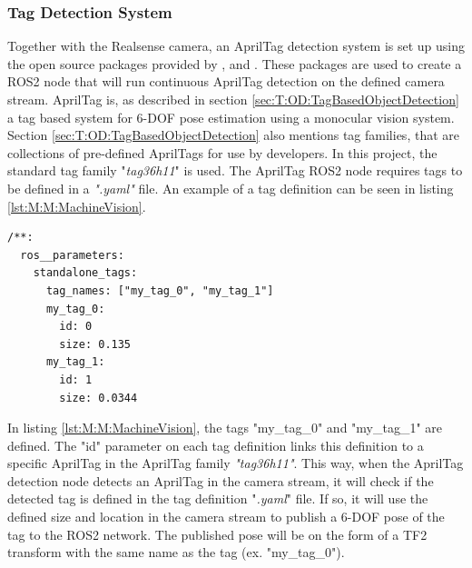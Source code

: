 \subsubsection{Tag Detection System} \label{sec:M:MRC:MV:TagDetectionSystem}
Together with the Realsense camera, an AprilTag detection system is set up using the open source packages provided by \cite{apriltag_repo}, \cite{apriltag_ros_repo} and \cite{apriltag_msgs_repo}. These packages are used to create a ROS2 node that will run continuous AprilTag detection on the defined camera stream. AprilTag is, as described in section \ref{sec:T:OD:TagBasedObjectDetection} a tag based system for 6-DOF pose estimation using a monocular vision system. Section \ref{sec:T:OD:TagBasedObjectDetection} also mentions tag families, that are collections of pre-defined AprilTags for use by developers. In this project, the standard tag family "\textit{tag36h11}" is used. The AprilTag ROS2 node requires tags to be defined in a \textit{".yaml"} file. An example of a tag definition can be seen in listing \ref{lst:M:M:MachineVision}.

\begin{lstlisting}[language=XML, label=lst:M:M:MachineVision, caption={Example of AprilTag tag definitions in a ".yaml" file. This example defines two tags of different names, using the tag id 0 and 1 in the defined tag family The size is alse defined for each tag. The tag family (tag36h11) is set in another parameter file.}]
/**:
  ros__parameters:
    standalone_tags:
      tag_names: ["my_tag_0", "my_tag_1"]
      my_tag_0:
        id: 0
        size: 0.135
      my_tag_1:
        id: 1
        size: 0.0344
\end{lstlisting}

In listing \ref{lst:M:M:MachineVision}, the tags "my\_tag\_0" and "my\_tag\_1" are defined. The "id" parameter on each tag definition links this definition to a specific AprilTag in the AprilTag family \textit{"tag36h11"}. This way, when the AprilTag detection node detects an AprilTag in the camera stream, it will check if the detected tag is defined in the tag definition "\textit{.yaml}" file. If so, it will use the defined size and location in the camera stream to publish a 6-DOF pose of the tag to the ROS2 network. The published pose will be on the form of a TF2 transform with the same name as the tag (ex. "my\_tag\_0").


